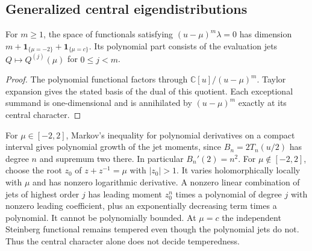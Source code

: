\subsection{Generalized central eigendistributions}
\begin{theorem}\label{thm:duality-jets}
For $m\ge1$, the space of functionals satisfying $(u-\mu)^m\lambda=0$ has dimension
$m+\mathbf1_{\{\mu=-2\}}+\mathbf1_{\{\mu=c\}}$. Its polynomial part consists of the evaluation jets $Q\mapsto Q^{(j)}(\mu)$ for $0\le j<m$.
\end{theorem}
\begin{proof}
The polynomial functional factors through $\mathbb C[u]/(u-\mu)^m$. Taylor expansion gives the stated basis of the dual of this quotient. Each exceptional summand is one-dimensional and is annihilated by $(u-\mu)^m$ exactly at its central character.
\end{proof}
For $\mu\in[-2,2]$, Markov's inequality for polynomial derivatives on a compact interval gives polynomial growth of the jet moments, since $B_n=2T_n(u/2)$ has degree $n$ and supremum two there. In particular $B_n'(2)=n^2$. For $\mu\notin[-2,2]$, choose the root $z_0$ of $z+z^{-1}=\mu$ with $|z_0|>1$. It varies holomorphically locally with $\mu$ and has nonzero logarithmic derivative. A nonzero linear combination of jets of highest order $j$ has leading moment $z_0^n$ times a polynomial of degree $j$ with nonzero leading coefficient, plus an exponentially decreasing term times a polynomial. It cannot be polynomially bounded. At $\mu=c$ the independent Steinberg functional remains tempered even though the polynomial jets do not. Thus the central character alone does not decide temperedness.

